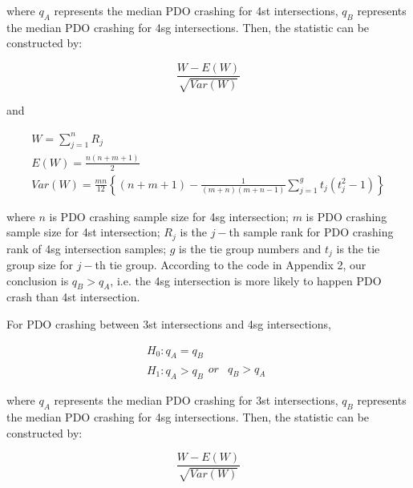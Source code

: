 \documentclass[11pt]{scrartcl} %
\begin{document}
where ${q_A}$ represents the median PDO crashing for 4st intersections, $q_B$ represents the median PDO crashing for 4sg intersections. Then, the statistic can be constructed by:

\begin{equation*}
\frac{{W - E\left( W \right)}}{{\sqrt {Var\left( W \right)} }}
\end{equation*}

and

\begin{equation*}
\begin{array}{l}
W = \sum\limits_{j = 1}^n {{R_j}} \\
E\left( W \right) = \frac{{n\left( {n + m + 1} \right)}}{2}\\
Var\left( W \right) = \frac{{mn}}{{12}}\left\{ {\left( {n + m + 1} \right) - \frac{1}{{\left( {m + n} \right)\left( {m + n - 1} \right)}}\sum\limits_{j = 1}^g {{t_j}\left( {t_j^2 - 1} \right)} } \right\}
\end{array}
\end{equation*}

where $n$ is PDO crashing sample size for 4sg intersection; $m$ is PDO crashing sample size for 4st intersection; $R_j$ is the $j-$th sample rank for PDO crashing rank of 4sg intersection samples; $g$ is the tie group numbers and $t_j$ is the tie group size for $j-$th tie group. According to the code in Appendix 2, our conclusion is ${{q_B} > {q_A}}$, i.e. the 4sg intersection is more likely to happen PDO crash than 4st intersection.

\par

For PDO crashing between 3st intersections and 4sg intersections,

\begin{equation*}
\begin{array}{l}
{H_0}:{q_A} = {q_B}\\
{H_1}:{q_A} > {q_B}\begin{array}{*{20}{c}}
{or}&{{q_B} > {q_A}}
\end{array}
\end{array}
\end{equation*}

where ${q_A}$ represents the median PDO crashing for 3st intersections, $q_B$ represents the median PDO crashing for 4sg intersections. Then, the statistic can be constructed by:

\begin{equation*}
\frac{{W - E\left( W \right)}}{{\sqrt {Var\left( W \right)} }}
\end{equation*}
\end{document}
